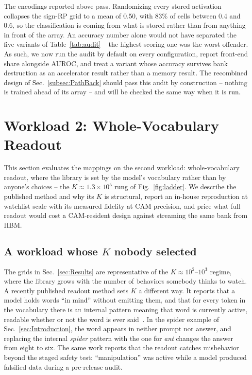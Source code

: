 \documentclass[conference]{IEEEtran}
\newcommand{\cam}{{CAM}\xspace}
\newcommand{\auroc}{{AUROC}\xspace}
\newcommand{\signrp}{{sign-RP}\xspace}
\begin{document}
The encodings reported above pass. Randomizing every stored
activation collapses the \signrp grid to a mean of 0.50, with 83\%
of cells between 0.4 and 0.6, so the classification is coming from
what is stored rather than from anything in front of the array. An
accuracy number alone would not have separated the five variants of
Table~\ref{tab:audit} -- the highest-scoring one was the worst
offender. As such, we now run the audit by default on every
configuration, report front-end share alongside \auroc, and treat a
variant whose accuracy survives bank destruction as an accelerator
result rather than a memory result. The recombined design of
Sec.~\ref{subsec:PathBack} should pass this audit by construction --
nothing is trained ahead of its array -- and will be checked the
same way when it is run.


\section{Workload 2: Whole-Vocabulary Readout}
\label{sec:LargeK}

This section evaluates the mappings on the second workload:
whole-vocabulary readout, where the library is set by the model's
vocabulary rather than by anyone's choices -- the
$K\approx1.3\times10^{5}$ rung of Fig.~\ref{fig:ladder}. We describe
the published method and why its $K$ is structural, report an
in-house reproduction at watchlist scale with its measured fidelity
at \cam precision, and price what full readout would cost a
\cam-resident design against streaming the same bank from HBM.

\subsection{A workload whose $K$ nobody selected}
\label{subsec:Jspace}
The grids in Sec.~\ref{sec:Results} are representative of the
$K\approx10^{2}$--$10^{3}$ regime, where the library grows with the
number of behaviors somebody thinks to watch. A recently published
readout method sets $K$ a different way. It reports that a model holds words ``in
mind'' without emitting them, and that for every token in the vocabulary
there is an internal pattern meaning that word is currently active,
readable whether or not the word is ever
said~\cite{anthropic2026workspace}. In the spider example of
Sec.~\ref{sec:Introduction}, the word appears in neither prompt nor
answer, and replacing the internal \emph{spider} pattern with the one
for \emph{ant} changes the answer from eight to six. The same work
reports that the readout catches misbehavior beyond the staged safety
test: ``manipulation'' was active while a model produced falsified
data during a pre-release audit.
\end{document}
